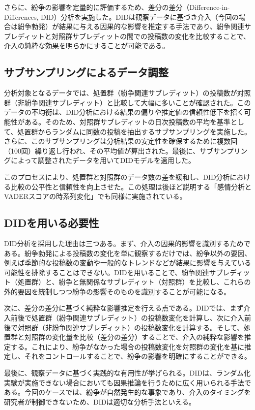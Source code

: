 \documentclass[11pt, a4j]{jreport}
\begin{document}
    さらに、紛争の影響を定量的に評価するため、差分の差分（Difference-in-Differences, DID）分析を実施した。DIDは観察データに基づき介入（今回の場合は紛争勃発）が結果に与える因果的な影響を推定する手法であり、紛争関連サブレディットと対照群サブレディットの間での投稿数の変化を比較することで、介入の純粋な効果を明らかにすることが可能である。

    \subsection{サブサンプリングによるデータ調整}
    分析対象となるデータでは、処置群（紛争関連サブレディット）の投稿数が対照群（非紛争関連サブレディット）と比較して大幅に多いことが確認された。このデータの不均衡は、DID分析における結果の偏りや推定値の信頼性低下を招く可能性がある。そのため、対照群サブレディットの日次投稿数の平均を基準として、処置群からランダムに同数の投稿を抽出するサブサンプリングを実施した。さらに、このサブサンプリングは分析結果の安定性を確保するために複数回（100回）繰り返し行われ、その平均値が算出された。最後に、サブサンプリングによって調整されたデータを用いてDIDモデルを適用した。

    このプロセスにより、処置群と対照群のデータ数の差を緩和し、DID分析における比較の公平性と信頼性を向上させた。この処理は後ほど説明する「感情分析とVADERスコアの時系列変化」でも同様に実施されている。

    \subsection{DIDを用いる必要性}
    DID分析を採用した理由は三つある。まず、介入の因果的影響を識別するためである。紛争勃発による投稿数の変化を単に観察するだけでは、紛争以外の要因、例えば季節的な投稿数の変動や一般的なトレンドなどが結果に影響を与えている可能性を排除することはできない。DIDを用いることで、紛争関連サブレディット（処置群）と、紛争と無関係なサブレディット（対照群）を比較し、これらの外的要因を統制しつつ紛争の影響そのものを識別することが可能になる。
    
    次に、差分の差分に基づく純粋な影響推定を行える点である。DIDでは、まず介入前後で処置群（紛争関連サブレディット）の投稿数変化を計算し、次に介入前後で対照群（非紛争関連サブレディット）の投稿数変化を計算する。そして、処置群と対照群の変化量を比較（差分の差分）することで、介入の純粋な影響を推定する。これにより、紛争がなかった場合の投稿数変化を対照群の変化を基に推定し、それをコントロールすることで、紛争の影響を明確にすることができる。
    
    最後に、観察データに基づく実践的な有用性が挙げられる。DIDは、ランダム化実験が実施できない場合においても因果推論を行うために広く用いられる手法である。今回のケースでは、紛争が自然発生的な事象であり、介入のタイミングを研究者が制御できないため、DIDは適切な分析手法といえる。
\end{document}
